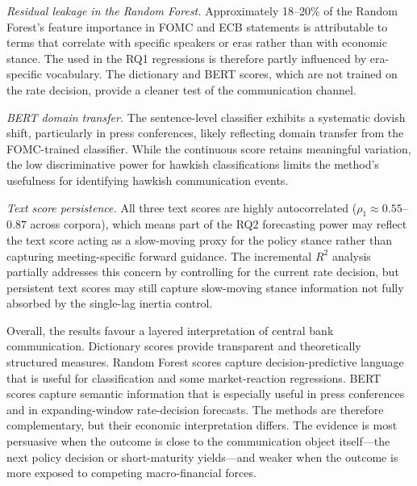 \emph{Residual leakage in the Random Forest.} Approximately 18--20\% of the
Random Forest's feature importance in FOMC and ECB statements is attributable
to terms that correlate with specific speakers or eras rather than with
economic stance. The \rfscore{} used in the RQ1 regressions is therefore
partly influenced by era-specific vocabulary. The dictionary and BERT
scores, which are not trained on the rate decision, provide a cleaner test of
the communication channel.

\emph{BERT domain transfer.} The sentence-level classifier exhibits a
systematic dovish shift, particularly in press conferences, likely reflecting
domain transfer from the FOMC-trained classifier. While the continuous score
retains meaningful variation, the low discriminative power for hawkish
classifications limits the method's usefulness for identifying hawkish
communication events.

\emph{Text score persistence.} All three text scores are highly autocorrelated
($\rho_1 \approx 0.55$--$0.87$ across corpora), which means part of the RQ2
forecasting power may reflect the text score acting as a slow-moving proxy for
the policy stance rather than capturing meeting-specific forward guidance. The
incremental $R^2$ analysis partially addresses this concern by controlling for
the current rate decision, but persistent text scores may still capture
slow-moving stance information not fully absorbed by the single-lag inertia
control.

Overall, the results favour a layered interpretation of central bank
communication. Dictionary scores provide transparent and theoretically
structured measures. Random Forest scores capture decision-predictive language
that is useful for classification and some market-reaction regressions.
BERT scores capture semantic information that is especially useful in
press conferences and in expanding-window rate-decision forecasts. The methods
are therefore complementary, but their economic interpretation differs. The
evidence is most persuasive when the outcome is close to the communication
object itself---the next policy decision or short-maturity yields---and weaker
when the outcome is more exposed to competing macro-financial forces.